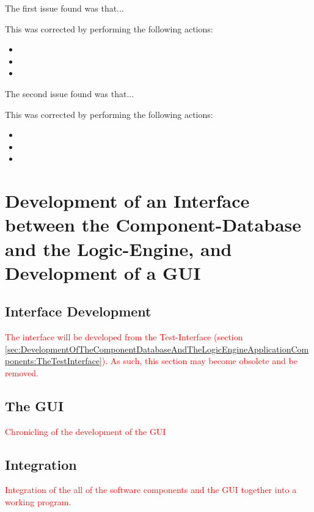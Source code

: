 The first issue found was that...

This was corrected by performing the following actions:
\begin{itemize}
\item
\item
\item
\end{itemize}

The second issue found was that...

This was corrected by performing the following actions:
\begin{itemize}
\item
\item
\item
\end{itemize}

\section{Development of an Interface between the Component-Database and the Logic-Engine, and Development of a GUI}
\label{sec:DevelopmentOfAnInterfaceBetweenTheComponentDatabaseAndTheLogicEngineAndDevelopmentOfAGUI}

\subsection{Interface Development}
\label{sec:DevelopmentOfAnInterfaceBetweenTheComponentDatabaseAndTheLogicEngineAndDevelopmentOfAGUI:InterfaceDevelopment}
\textcolor{red}{The interface will be developed from the Test-Interface (section \ref{sec:DevelopmentOfTheComponentDatabaseAndTheLogicEngineApplicationComponents:TheTestInterface}). As such, this section may become obsolete and be removed.}

\subsection{The GUI}
\label{sec:DevelopmentOfAnInterfaceBetweenTheComponentDatabaseAndTheLogicEngineAndDevelopmentOfAGUI:TheGUI}
\textcolor{red}{Chronicling of the development of the GUI}

\subsection{Integration}
\label{sec:DevelopmentOfAnInterfaceBetweenTheComponentDatabaseAndTheLogicEngineAndDevelopmentOfAGUI:Integration}
\textcolor{red}{Integration of the all of the software components and the GUI together into a working program.}